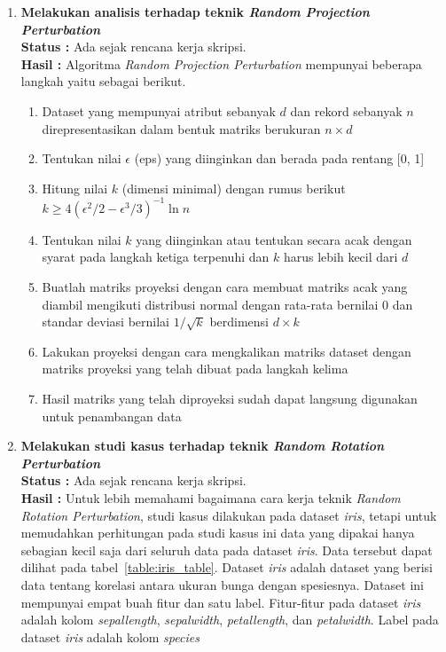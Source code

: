 \documentclass[a4paper,twoside]{article}
\begin{document}
\begin{enumerate}
		\item \textbf{Melakukan analisis terhadap teknik \textit{Random Projection Perturbation}}\\
		{\bf Status :} Ada sejak rencana kerja skripsi.\\
		{\bf Hasil :} Algoritma \textit{Random Projection Perturbation} mempunyai beberapa langkah yaitu sebagai berikut.
		\begin{enumerate}
			\item Dataset yang mempunyai atribut sebanyak \(d\) dan rekord sebanyak \(n\) direpresentasikan dalam bentuk matriks berukuran \(n \times d\)
			\item Tentukan nilai \(\epsilon\) (eps) yang diinginkan dan berada pada rentang [0, 1]
			\item Hitung nilai \(k\) (dimensi minimal) dengan rumus berikut \(k \geq 4(\epsilon^{2}/2-\epsilon^{3}/3)^{-1}\ln{n}\)
			\item Tentukan nilai \(k\) yang diinginkan atau tentukan secara acak dengan syarat pada langkah ketiga terpenuhi dan \(k\) harus lebih kecil dari \(d\)
			\item Buatlah matriks proyeksi dengan cara membuat matriks acak yang diambil mengikuti distribusi normal dengan rata-rata bernilai 0 dan standar deviasi bernilai \(1/\sqrt{k}\) berdimensi \(d \times k\)
			\item Lakukan proyeksi dengan cara mengkalikan matriks dataset dengan matriks proyeksi yang telah dibuat pada langkah kelima
			\item Hasil matriks yang telah diproyeksi sudah dapat langsung digunakan untuk penambangan data
		\end{enumerate}

		\item \textbf{Melakukan studi kasus terhadap teknik \textit{Random Rotation Perturbation}}\\
		{\bf Status :} Ada sejak rencana kerja skripsi.\\
		{\bf Hasil :} Untuk lebih memahami bagaimana cara kerja teknik \textit{Random Rotation Perturbation}, studi kasus dilakukan pada dataset \textit{iris}, tetapi untuk memudahkan perhitungan pada studi kasus ini data yang dipakai hanya sebagian kecil saja dari seluruh data pada dataset \textit{iris}. Data tersebut dapat dilihat pada tabel~\ref{table:iris_table}. Dataset \textit{iris} adalah dataset yang berisi data tentang korelasi antara ukuran bunga dengan spesiesnya. Dataset ini mempunyai empat buah fitur dan satu label. Fitur-fitur pada dataset \textit{iris} adalah kolom \textit{sepal\textunderscore length}, \textit{sepal\textunderscore width}, \textit{petal\textunderscore length}, dan \textit{petal\textunderscore width}. Label pada dataset \textit{iris} adalah kolom \textit{species}


\end{enumerate}
\end{document}
